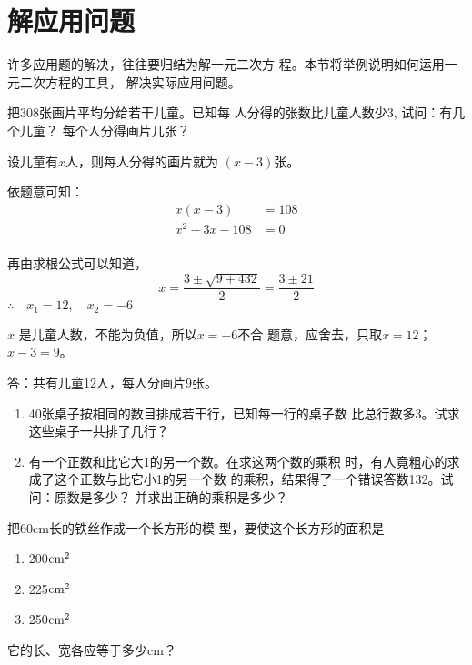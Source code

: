 \begin{enumerate}
\end{enumerate}


\section{解应用问题}
许多应用题的解决，往往要归结为解一元二次方
程。本节将举例说明如何运用一元二次方程的工具，
解决实际应用问题。

\begin{example}
把308张画片平均分给若干儿童。已知每
人分得的张数比儿童人数少3, 试问：有几个儿童？
每个人分得画片几张？
\end{example}

\begin{solution}
    设儿童有$x$人，则每人分得的画片就为
$(x-3)$张。

依题意可知：\[\begin{split}
    x(x-3)&=108\\
x^2-3x-108&=0\\
\end{split}\]

再由求根公式可以知道，
\[x=\frac{3\pm\sqrt{9+432}}{2}=\frac{3\pm 21}{2}  \]
$\therefore\quad x_1=12,\quad x_2=-6$

$x$
是儿童人数，不能为负值，所以$x=-6$不合
题意，应舍去，只取$x=12$； $x-3=9$。

答：共有儿童12人，每人分画片9张。
\end{solution}

\begin{ex}
\begin{enumerate}
    \item 40张桌子按相同的数目排成若干行，已知每一行的桌子数
    比总行数多3。试求这些桌子一共排了几行？
    \item 有一个正数和比它大1的另一个数。在求这两个数的乘积
    时，有人竟粗心的求成了这个正数与比它小1的另一个数
    的乘积，结果得了一个错误答数132。试问：原数是多少？
    并求出正确的乘积是多少？
\end{enumerate}
\end{ex}

\begin{example}
    把60cm长的铁丝作成一个长方形的模
    型，要使这个长方形的面积是
    \begin{multicols}{3}
        \begin{enumerate}
        \item 200${\rm cm}^2$
        \item 225${\rm cm}^2$
        \item 250${\rm cm}^2$
    \end{enumerate}        
    \end{multicols}
        
它的长、宽各应等于多少cm？
\end{example}


